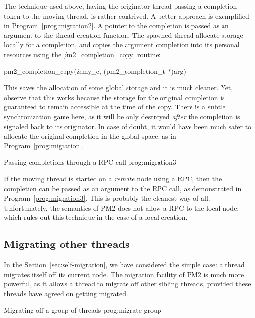 The technique used above, having the originator thread passing a
completion token to the moving thread, is rather contrived. A better
approach is exemplified in Program~\ref{prog:migration2}. A pointer to
the completion is passed as an argument to the thread creation
function. The spawned thread allocate storage locally for a
completion, and copies the argument completion into its personal
resources using the \|pm2_completion_copy| routine:
\begin{program}
pm2_completion_copy(&my_c, (pm2_completion_t *)arg)
\end{program}
This saves the allocation of some global storage and it is much
cleaner. Yet, observe that this works because the storage for the
original completion is guaranteed to remain accessible at the time of
the copy. There is a subtle synchronization game here, as it will be
only destroyed \emph{after} the completion is signaled back to its
originator. In case of doubt, it would have been much safer to
allocate the original completion in the global space, as in
Program~\ref{prog:migration}.

 {Passing completions through a RPC
  call} {prog:migration3}

If the moving thread is started on a \emph{remote} node using a RPC,
then the completion can be passed as an argument to the RPC call, as
demonstrated in Program~\ref{prog:migration3}. This is probably the
cleanest way of all. Unfortunately, the semantics of PM2 does not
allow a RPC to the local node, which rules out this technique in the
case of a local creation.

\subsection{Migrating other threads}

In the Section~\ref{sec:self-migration}, we have considered the simple
case: a thread migrates itself off its current node. The migration
facility of PM2 is much more powerful, as it allows a thread to
migrate off other sibling threads, provided these threads have agreed
on getting migrated.

 {Migrating off a group of
  threads} {prog:migrate-group}

